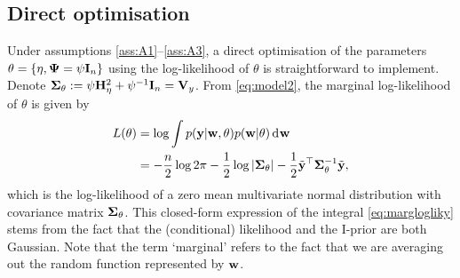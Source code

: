 \subsection{Direct optimisation}

Under assumptions \ref{ass:A1}--\ref{ass:A3}, a direct optimisation of the parameters $\theta=\{\eta,\bPsi=\psi\bI_n \}$ using the log-likelihood of $\theta$ is straightforward to implement.
Denote $\bSigma_\theta := \psi\bH_\eta^2 + \psi^{-1}\bI_n = \bV_y$.
From \cref{eq:model2}, the marginal log-likelihood of $\theta$ is given by
\begin{align}
  L(\theta)
  &= \log \int p(\by|\bw,\theta)p(\bw|\theta) \dint \bw \nonumber \\
  &= -\half[n]\log 2\pi - \half\log\vert \bSigma_\theta \vert - \half \tilde\by^\top \bSigma_\theta^{-1} \tilde\by \label{eq:marglogliky},
\end{align}
which is the log-likelihood of a zero mean multivariate normal distribution with covariance matrix $\bSigma_\theta$.
This closed-form expression of the integral \cref{eq:marglogliky} stems from the fact that the (conditional) likelihood and the I-prior are both Gaussian.
Note that the term `marginal' refers to the fact that we are averaging out the random function represented by $\bw$.

